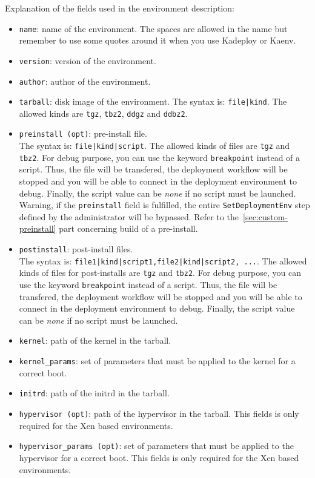 \documentclass[a4wide,10pt,oneside]{book}
\begin{document}
Explanation of the fields used in the environment description:
\begin{itemize}
\item \texttt{name}: name of the environment. The spaces are allowed in the name but remember to use some quotes around it when you use Kadeploy or Kaenv.
\item \texttt{version}: version of the environment.
\item \texttt{author}: author of the environment.
\item \texttt{tarball}: disk image of the environment. The syntax is: \texttt{file|kind}. The allowed kinds are \texttt{tgz}, \texttt{tbz2}, \texttt{ddgz} and \texttt{ddbz2}.
\item \texttt{preinstall (opt)}: pre-install file.\\ The syntax is: \texttt{file|kind|script}. The allowed kinds of files are \texttt{tgz} and \texttt{tbz2}. For debug purpose, you can use the keyword \texttt{breakpoint} instead of a script. Thus, the file will be transfered, the deployment workflow will be stopped and you will be able to connect in the deployment environment to debug. Finally, the script value can be \textit{none} if no script must be launched. Warning, if the \texttt{preinstall} field is fulfilled, the entire \texttt{SetDeploymentEnv} step defined by the administrator will be bypassed. Refer to the~\ref{sec:custom-preinstall} part concerning build of a pre-install.
\item \texttt{postinstall}: post-install files.\\ The syntax is: \texttt{file1|kind|script1,file2|kind|script2, ...}. The allowed kinds of files for post-installs are \texttt{tgz} and \texttt{tbz2}. For debug purpose, you can use the keyword \texttt{breakpoint} instead of a script. Thus, the file will be transfered, the deployment workflow will be stopped and you will be able to connect in the deployment environment to debug. Finally, the script value can be \textit{none} if no script must be launched.
\item \texttt{kernel}: path of the kernel in the tarball.
\item \texttt{kernel\_params}: set of parameters that must be applied to the kernel for a correct boot.
\item \texttt{initrd}: path of the initrd in the tarball.
\item \texttt{hypervisor (opt)}: path of the hypervisor in the tarball. This fields is only required for the Xen based environments.
\item \texttt{hypervisor\_params (opt)}: set of parameters that must be applied to the hypervisor for a correct boot. This fields is only required for the Xen based environments.

\end{itemize}
\end{document}
